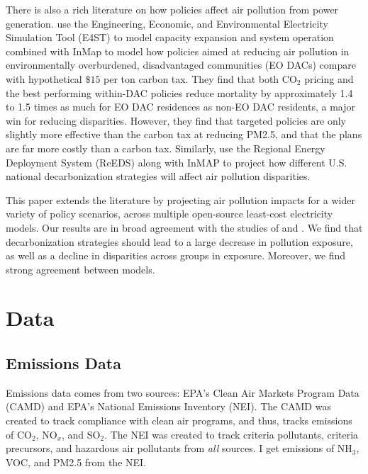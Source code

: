 \documentclass[a4paper]{article}
\theoremstyle{definition}
\theoremstyle{plain}
\begin{document}
There is also a rich literature on how policies affect air pollution from power generation.  \citet{Shawhan2024PoliciesAmericans} use the  Engineering, Economic, and Environmental Electricity Simulation Tool (E4ST) to model capacity expansion and system operation combined with InMap to model how policies aimed at reducing air pollution in environmentally overburdened, disadvantaged communities (EO DACs) compare with hypothetical $\$15$ per ton carbon tax.  They find that both CO$_2$ pricing and the best performing within-DAC policies reduce mortality by approximately 1.4 to 1.5 times as much for EO DAC residences as non-EO DAC residents, a major win for reducing disparities.  However, they find that targeted policies are only slightly more effective than the carbon tax at reducing PM2.5, and that the plans are far more costly than a carbon tax.  Similarly, \citet{Goforth2022AirStrategies} use the Regional Energy Deployment System (ReEDS) along with InMAP to project how different U.S. national decarbonization strategies will affect air pollution disparities.  

This paper extends the literature by projecting air pollution impacts for a wider variety of policy scenarios, across multiple open-source least-cost electricity models.  Our results are in broad agreement with the studies of \citet{Goforth2022AirStrategies} and \citet{Shawhan2024PoliciesAmericans}.  We find that decarbonization strategies should lead to a large decrease in pollution exposure, as well as  a decline in disparities across groups in exposure.  Moreover, we find strong agreement between models.



\section{Data}

\subsection{Emissions Data}
Emissions data comes from two sources: EPA's Clean Air Markets Program Data (CAMD) and EPA's National Emissions Inventory (NEI).  The CAMD was created to track compliance with clean air programs, and thus, tracks emissions of CO$_2$, NO$_x$, and SO$_2$.  The NEI was created to track criteria pollutants, criteria precursors, and hazardous air pollutants from \textit{all} sources.  I get emissions of NH$_3$, VOC, and PM2.5 from the NEI. 
\end{document}
